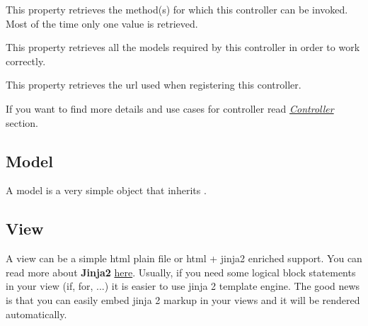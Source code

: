\documentclass[letterpaper,10pt,english]{sphinxmanual}
\begin{document}
\begin{fulllineitems}
\begin{fulllineitems}
\label{features/mvc:fantastico.mvc.controller_decorators.Controller.method}
This property retrieves the method(s) for which this controller can be invoked. Most of the time only one value is
retrieved.

\end{fulllineitems}


\begin{fulllineitems}
\label{features/mvc:fantastico.mvc.controller_decorators.Controller.models}
This property retrieves all the models required by this controller in order to work correctly.

\end{fulllineitems}


\begin{fulllineitems}
\label{features/mvc:fantastico.mvc.controller_decorators.Controller.url}
This property retrieves the url used when registering this controller.

\end{fulllineitems}


\end{fulllineitems}


If you want to find more details and use cases for controller read {\hyperref[features/mvc:core-controller-section]{\emph{Controller}}} section.


\subsection{Model}
\label{features/mvc:model}
A model is a very simple object that inherits .


\subsection{View}
\label{features/mvc:view}
A view can be a simple html plain file or html + jinja2 enriched support. You can read more about \textbf{Jinja2}
\href{http://jinja.pocoo.org/docs/}{here}. Usually, if you need some logical block statements in your view (if, for, ...)
it is easier to use jinja 2 template engine. The good news is that you can easily embed jinja 2 markup in your views
and it will be rendered automatically.
\end{document}
